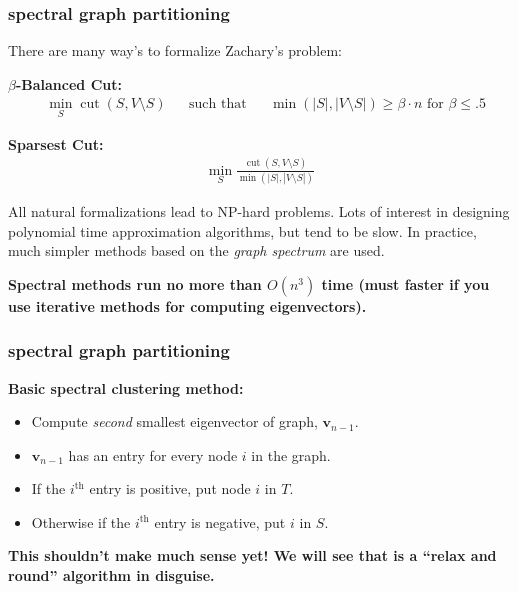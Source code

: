 \documentclass[compress]{beamer}
\newcommand{\bv}[1]{\mathbf{#1}}
\DeclareMathOperator{\cut}{cut}
\begin{document}
\begin{frame}[t]
	\frametitle{spectral graph partitioning}
	There are many way's to formalize Zachary's problem:
	
		\textbf{$\beta$-Balanced Cut:}
	\begin{align*}
		&\min_{S} {\cut(S, V\setminus S)} & &\text{such that} & &\min\left(|S|,|V\setminus S|\right) \geq \beta\cdot n \text{ for } \beta \leq .5
	\end{align*}
	
	\textbf{Sparsest Cut:}
	\begin{align*}
		\min_{S} \frac{\cut(S, V\setminus S)}{\min\left(|S|,|V\setminus S|\right)}
	\end{align*}



	All natural formalizations lead to NP-hard problems. Lots of interest in designing polynomial time approximation algorithms, but tend to be slow. In practice, much simpler methods based on the \emph{graph spectrum} are used. 
	
	\begin{center}
		\textbf{Spectral  methods run no more than $O(n^3)$ time (must faster if you use iterative methods for computing eigenvectors).}
	\end{center}
\end{frame}

\begin{frame}
		\frametitle{spectral graph partitioning}
	\textbf{Basic spectral clustering method:}
	\begin{itemize}
		\item Compute \emph{second} smallest eigenvector of graph, $\bv{v}_{n-1}$.
		\item $\bv{v}_{n-1}$ has an entry for every node $i$ in the graph.
		\item If the $i^{\text{th}}$ entry is positive, put node $i$ in $T$.
		\item Otherwise if the $i^{\text{th}}$ entry is negative, put $i$ in $S$.
	\end{itemize}	
\begin{center}
	\textbf{\alert{This shouldn't make much sense yet!} We will see that is a ``relax and round'' algorithm in disguise.}
\end{center}
\end{frame}
\end{document}
